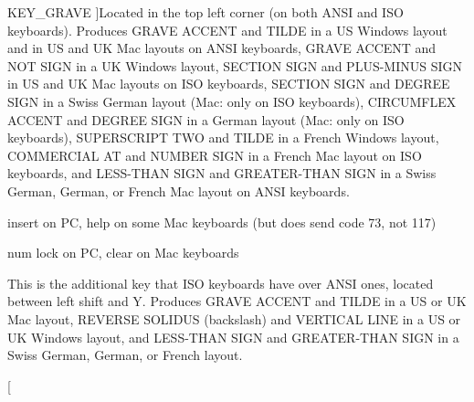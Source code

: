 \begin{Desc}
\begin{description}
{\hypertarget{classphys_1_1MetaCode_a3e501cbb5bf0f6f1fdb7211465bda8d8a1961eccca163bf3ceb9e6dea3c23375c}{
KEY\_\-GRAVE}
\label{classphys_1_1MetaCode_a3e501cbb5bf0f6f1fdb7211465bda8d8a1961eccca163bf3ceb9e6dea3c23375c}
}]Located in the top left corner (on both ANSI and ISO keyboards). Produces GRAVE ACCENT and TILDE in a US Windows layout and in US and UK Mac layouts on ANSI keyboards, GRAVE ACCENT and NOT SIGN in a UK Windows layout, SECTION SIGN and PLUS-\/MINUS SIGN in US and UK Mac layouts on ISO keyboards, SECTION SIGN and DEGREE SIGN in a Swiss German layout (Mac: only on ISO keyboards), CIRCUMFLEX ACCENT and DEGREE SIGN in a German layout (Mac: only on ISO keyboards), SUPERSCRIPT TWO and TILDE in a French Windows layout, COMMERCIAL AT and NUMBER SIGN in a French Mac layout on ISO keyboards, and LESS-\/THAN SIGN and GREATER-\/THAN SIGN in a Swiss German, German, or French Mac layout on ANSI keyboards. \item[{\em 
\hypertarget{classphys_1_1MetaCode_a3e501cbb5bf0f6f1fdb7211465bda8d8a708ea6204b1cc2ed7756989b8d850ce6}{
KEY\_\-INSERT}
\label{classphys_1_1MetaCode_a3e501cbb5bf0f6f1fdb7211465bda8d8a708ea6204b1cc2ed7756989b8d850ce6}
}]insert on PC, help on some Mac keyboards (but does send code 73, not 117) \item[{\em 
\hypertarget{classphys_1_1MetaCode_a3e501cbb5bf0f6f1fdb7211465bda8d8a7cd4a721f5b2be2cc13856a46199508a}{
KEY\_\-NUMLOCKCLEAR}
\label{classphys_1_1MetaCode_a3e501cbb5bf0f6f1fdb7211465bda8d8a7cd4a721f5b2be2cc13856a46199508a}
}]num lock on PC, clear on Mac keyboards \item[{\em 
\hypertarget{classphys_1_1MetaCode_a3e501cbb5bf0f6f1fdb7211465bda8d8a858a1c9e3bd7b047e05220da9b0a3966}{
KEY\_\-NONUSBACKSLASH}
\label{classphys_1_1MetaCode_a3e501cbb5bf0f6f1fdb7211465bda8d8a858a1c9e3bd7b047e05220da9b0a3966}
}]This is the additional key that ISO keyboards have over ANSI ones, located between left shift and Y. Produces GRAVE ACCENT and TILDE in a US or UK Mac layout, REVERSE SOLIDUS (backslash) and VERTICAL LINE in a US or UK Windows layout, and LESS-\/THAN SIGN and GREATER-\/THAN SIGN in a Swiss German, German, or French layout. \item[{\em 
}
\end{description}
\end{Desc}

